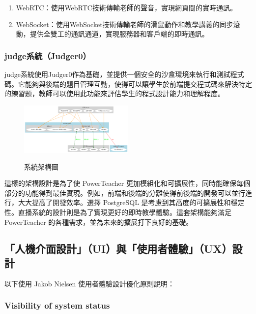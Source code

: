 \documentclass[12pt]{article}
\begin{document}
\begin{enumerate}[label=\textbullet, noitemsep]
  \item WebRTC：使用WebRTC技術傳輸老師的聲音，實現網頁間的實時通訊。
  \item WebSocket：使用WebSocket技術傳輸老師的滑鼠動作和教學講義的同步滾動，提供全雙工的通訊通道，實現服務器和客戶端的即時通訊。
\end{enumerate}

\subsubsection{judge系統（Judger0）}
judge系統使用Judger0作為基礎，並提供一個安全的沙盒環境來執行和測試程式碼。它能夠與後端的題目管理互動，使得可以讓學生於前端提交程式碼來解決特定的練習題，教師可以使用此功能來評估學生的程式設計能力和理解程度。\\

\begin{figure}[htb]
  \centering
  \href{https://raw.githubusercontent.com/programingtw/proglearn-plan/main/img/powerteacherarc.png}{
    \includegraphics[width=0.5\textwidth]{../img/powerteacherarc.png}
  }
  \caption{系統架構圖}
  \label{arc1}            
\end{figure}

這樣的架構設計是為了使 PowerTeacher 更加模組化和可擴展性，同時能確保每個部分的功能得到最佳實現。例如，前端和後端的分離使得前後端的開發可以並行進行，大大提高了開發效率。選擇 PostgreSQL 是考慮到其高度的可擴展性和穩定性。直播系統的設計則是為了實現更好的即時教學體驗。這套架構能夠滿足 PowerTeacher 的各種需求，並為未來的擴展打下良好的基礎。

\subsection{「人機介面設計」（UI）與「使用者體驗」（UX）設計}

以下使用 Jakob Nielsen 使用者體驗設計優化原則說明：

\subsubsection{Visibility of system status}
\end{document}
